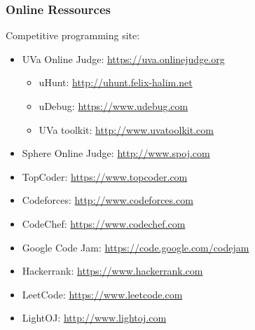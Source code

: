 \documentclass{beamer}
\begin{document}
\begin{frame}%
\frametitle{Online Ressources}

Competitive programming site:
\footnotesize

\begin{itemize}

\item UVa Online Judge: \url{https://uva.onlinejudge.org}
\begin{itemize}
\footnotesize
\item uHunt: \url{http://uhunt.felix-halim.net}
\item uDebug: \url{https://www.udebug.com}
\item UVa toolkit: \url{http://www.uvatoolkit.com}
\end{itemize}

\item Sphere Online Judge: \url{http://www.spoj.com}

\item TopCoder: \url{https://www.topcoder.com}

\item Codeforces: \url{http://www.codeforces.com}

\item CodeChef: \url{https://www.codechef.com}

\item Google Code Jam: \url{https://code.google.com/codejam}

\item Hackerrank: \url{https://www.hackerrank.com}

\item LeetCode: \url{https://www.leetcode.com}

\item LightOJ: \url{http://www.lightoj.com}

\end{itemize}

\end{frame}
\end{document}
